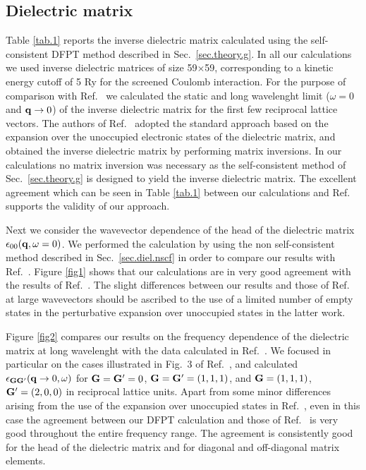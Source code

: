 \documentclass[twocolumn,prb,showpacs,superscriptaddress]{revtex4}
\def\w{\omega}
\def\q{{\bf q}}
\def\G{{\bf G}}
\def\Gp{{\bf G^\prime}}
\begin{document}
\subsection{Dielectric matrix}\label{sec.5a}

Table \ref{tab.1} reports the inverse dielectric matrix calculated using
the self-consistent DFPT method described in Sec.~\ref{sec.theory.g}.
In all our calculations we used inverse dielectric matrices of size 59$\times$59, 
corresponding to a kinetic energy cutoff of 5 Ry for the screened Coulomb interaction.
For the purpose of comparison with Ref.\  
we calculated the static and long wavelenght limit ($\w=0$ and $\q \rightarrow 0$) of the inverse dielectric matrix
for the first few reciprocal lattice vectors. 
The authors of Ref.\  adopted the standard approach based 
on the expansion over the unoccupied electronic states of the dielectric matrix, 
and obtained the inverse dielectric matrix by performing matrix inversions.
In our calculations no matrix inversion was necessary as the self-consistent method 
of Sec.~\ref{sec.theory.g} is designed to yield the inverse dielectric matrix.
The excellent agreement which can be seen in Table \ref{tab.1} between 
our calculations and Ref.~ supports the validity of our approach.

Next we consider the wavevector dependence of the head of the
dielectric matrix $\epsilon_{00}(\q,\w=0)$. We performed the
calculation by using the non self-consistent method described in
Sec.\ \ref{sec.diel.nscf} in order to compare our results with Ref.\ .
Figure \ref{fig1} shows that our calculations are in very good agreement with the results
of Ref.\ . The slight differences between our results and those
of Ref.\  at large wavevectors should be ascribed to the use of a limited 
number of empty states in the perturbative expansion over unoccupied states in the latter work.

Figure \ref{fig2} compares our results on the frequency dependence of the dielectric matrix
at long wavelenght with the data calculated in Ref.\ . 
We focused in particular on the cases illustrated in Fig.\ 3 of Ref.\ ,
and calculated $\epsilon_{\G\Gp}(\q\rightarrow 0,\w)$ for $\G=\Gp=0$, $\G=\Gp=(1,1,1)$,
and $\G=(1,1,1)$, $\Gp=(2,0,0)$ in reciprocal lattice units.
Apart from some minor differences arising from the use of the expansion over unoccupied
states in Ref.\ , even in this case the agreement between our DFPT calculation 
and those of Ref.\  is very good throughout the entire frequency range.
The agreement is consistently good for the head of the dielectric matrix and for
diagonal and off-diagonal matrix elements.
\end{document}
